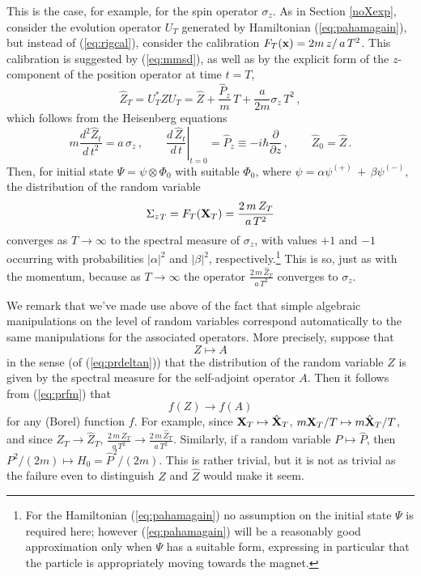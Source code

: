 \documentclass[12pt]{article}
\newcommand{\eq}[1]{(\ref{#1})}
\renewcommand{\a}{\alpha}
\begin{document}
This is the case, for example, for the spin operator $\sigma_{z}$. As
in Section \ref{noXexp}, consider the evolution operator $U_{T}$
generated by Hamiltonian (\ref{eq:pahamagain}), but instead of
(\ref{eq:rigcal}), consider the calibration $ F_{T}({\bf x}) = 2 m
\,z/\,a\, T^2 $. This calibration is suggested by (\ref{eq:mmsd}), as
well as by the explicit form of the $z$-component of the position
operator at time $t=T$,
\begin{equation}
\hat{Z}_T= U_{T}^{*} \hat{Z} U_{T} = \hat{Z} +
\frac{\hat{P}_z}{m}\,T + \frac{a}{2m}
\sigma_z\,T^{2}\,,
\label{eq:heispin}
\end{equation}
which follows {}from the Heisenberg equations
$$
m \frac{d^{2} \hat{Z}_{t}}{d\,t^2} = a\,\sigma_{z} \,, \qquad
\left.\frac{d\, \hat{Z}_{t}}{d\,t}\right|_{t=0}\!  = \hat{P}_{z}
\equiv -i\hbar\frac{\partial}{\partial z}\,,\qquad
\hat{Z}_{0}=\hat{Z}\,.
$$
Then, for initial state $\Psi = \psi\otimes\Phi_0$ with suitable $
\Phi_0 $, where $\psi= \alpha \psi^{(+)}\,+\, \beta\psi^{(-)}$, the
distribution of the random variable
$$
{\Sigma_{z}}_{T} = F_T({\bf X}_T) = \frac{2\,m \, Z_T }{a\, T^2}$$
converges as $T\to\infty$ to the spectral measure of $\sigma_z$, with
values $+1$ and $-1$ occurring with probabilities $|\a|^{2}$ and
$|\beta|^{2}$, respectively.\footnote{For the Hamiltonian
   \eq{eq:pahamagain} no assumption on the initial state $\Psi$ is
   required here; however \eq{eq:pahamagain} will be a reasonably good
   approximation only when $\Psi$ has a suitable form, expressing in
   particular that the particle is appropriately moving towards the
   magnet.}  This is so, just as with the momentum, because as
$T\to\infty$ the operator $ \frac{2\,m \, \hat{Z}_T }{a\, T^2}$
converges to $\sigma_{z}$.  \bigskip

We remark that we've made use above of the fact that simple algebraic
manipulations on the level of random variables correspond
automatically to the same manipulations for the associated operators.
More precisely, suppose that
\begin{equation}
Z \mapsto A
\label{eq:assrvop}
\end{equation}
in the sense (of \eq{eq:prdeltan}) that the distribution of the random
variable $Z$ is given by the spectral measure for the self-adjoint
operator $A$. Then it follows {}from (\ref{eq:prfm}) that
\begin{equation}
f(Z) \to f(A)
\label{eq:funcom}
\end{equation}
for any (Borel) function $f$.  For example, since ${\bf X}_T\mapsto
\hat{\bf X}_T$, $m{\bf X}_T/T\mapsto m\hat{\bf X}_T/T$, and since $Z_T
\to \hat{Z}_T$, $ \frac{2\,m \, {Z}_T }{a\, T^2} \to \frac{2\,m \,
   \hat{Z}_T }{a\, T^2}$. Similarly, if a random variable $P\mapsto
\hat{P}$, then $ P^2/(2m)\mapsto H_0= \hat{P}^2/(2m)$. This is rather
trivial, but it is not as trivial as the failure even to distinguish
$Z$ and $\hat{Z}$ would make it seem.
\end{document}
